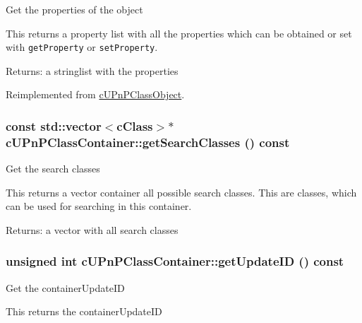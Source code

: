 Get the properties of the object

This returns a property list with all the properties which can be obtained or set with {\tt getProperty} or {\tt setProperty}.

\begin{Desc}
\item[Returns:]a stringlist with the properties \end{Desc}


Reimplemented from \hyperlink{classcUPnPClassObject_4a4d2cd2e59d364050bb64a3d9dced6e}{cUPnPClassObject}.\hypertarget{classcUPnPClassContainer_735327b72c023d3048db0d4fd2a608cc}{
\subsubsection[{getSearchClasses}]{\setlength{\rightskip}{0pt plus 5cm}const std::vector$<${\bf cClass}$>$$\ast$ cUPnPClassContainer::getSearchClasses () const}}
\label{classcUPnPClassContainer_735327b72c023d3048db0d4fd2a608cc}


Get the search classes

This returns a vector container all possible search classes. This are classes, which can be used for searching in this container.

\begin{Desc}
\item[Returns:]a vector with all search classes \end{Desc}
\hypertarget{classcUPnPClassContainer_475ad1a2003cc9b169685f825a9d790d}{
\subsubsection[{getUpdateID}]{\setlength{\rightskip}{0pt plus 5cm}unsigned int cUPnPClassContainer::getUpdateID () const}}
\label{classcUPnPClassContainer_475ad1a2003cc9b169685f825a9d790d}


Get the containerUpdateID

This returns the containerUpdateID

